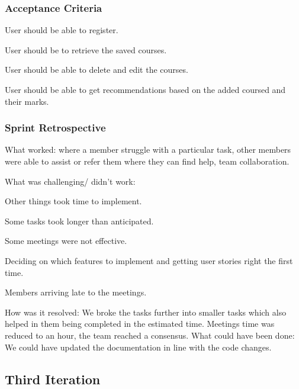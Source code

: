 \documentclass[10pt]{article}
\begin{document}
\subsubsection{Acceptance Criteria}

\begin{description}[font=$\bullet$~\normalfont\scshape\color{red!50!black}]

\item [] User should be able to register. 
\item [] User should be to retrieve the saved courses.
\item [] User should be able to delete and edit the courses.
\item [] User should be able to get recommendations based on the added coursed and their marks.

\end{description}

\subsubsection{Sprint Retrospective}

What worked: where a member struggle with a particular task, other members were able to assist or refer them where they can find help, team collaboration.

What was challenging/ didn’t work:

\begin{description}[font=$\bullet$~\normalfont\scshape\color{red!50!black}]

\item [] Other things took time to implement.
\item [] Some tasks took longer than anticipated.
\item [] Some meetings were not effective. 
\item [] Deciding on which features to implement and getting user stories   right the first time.
\item [] Members arriving late to the meetings.

\end{description}

How was it resolved: We broke the tasks further into smaller tasks which also helped in them being completed in the estimated time. Meetings time was reduced to an hour, the team reached a consensus.
What could have been done: We could have updated the documentation in line with the code changes. 

\subsection{Third Iteration}
\end{document}
